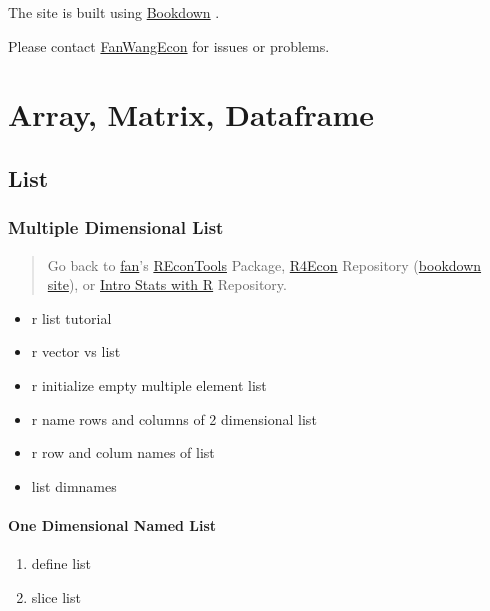 \documentclass[
]{book}
\providecommand{\tightlist}{%
  \setlength{\itemsep}{0pt}\setlength{\parskip}{0pt}}
\begin{document}
The site is built using \href{https://bookdown.org/}{Bookdown} \citep{R-bookdown}.

Please contact \href{https://fanwangecon.github.io/}{FanWangEcon} for issues or problems.

\hypertarget{array-matrix-dataframe}{%
\chapter{Array, Matrix, Dataframe}\label{array-matrix-dataframe}}

\hypertarget{list}{%
\section{List}\label{list}}

\hypertarget{multiple-dimensional-list}{%
\subsection{Multiple Dimensional List}\label{multiple-dimensional-list}}

\begin{quote}
Go back to \href{http://fanwangecon.github.io/}{fan}'s \href{https://fanwangecon.github.io/REconTools/}{REconTools} Package, \href{https://fanwangecon.github.io/R4Econ/}{R4Econ} Repository (\href{https://fanwangecon.github.io/R4Econ/bookdown}{bookdown site}), or \href{https://fanwangecon.github.io/Stat4Econ/}{Intro Stats with R} Repository.
\end{quote}

\begin{itemize}
\tightlist
\item
  r list tutorial
\item
  r vector vs list
\item
  r initialize empty multiple element list
\item
  r name rows and columns of 2 dimensional list
\item
  r row and colum names of list
\item
  list dimnames
\end{itemize}

\hypertarget{one-dimensional-named-list}{%
\subsubsection{One Dimensional Named List}\label{one-dimensional-named-list}}

\begin{enumerate}
\def\labelenumi{\arabic{enumi}.}
\tightlist
\item
  define list
\item
  slice list
\end{enumerate}
\end{document}
